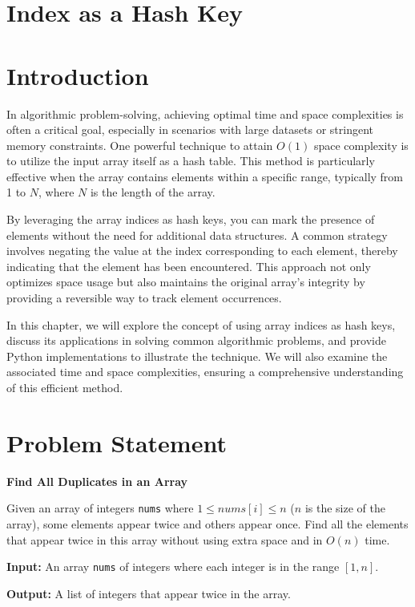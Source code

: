 \section{Index as a Hash Key}

\section*{Introduction}

In algorithmic problem-solving, achieving optimal time and space complexities is often a critical goal, especially in scenarios with large datasets or stringent memory constraints. One powerful technique to attain \(O(1)\) space complexity is to utilize the input array itself as a hash table. This method is particularly effective when the array contains elements within a specific range, typically from 1 to \(N\), where \(N\) is the length of the array.

By leveraging the array indices as hash keys, you can mark the presence of elements without the need for additional data structures. A common strategy involves negating the value at the index corresponding to each element, thereby indicating that the element has been encountered. This approach not only optimizes space usage but also maintains the original array's integrity by providing a reversible way to track element occurrences.

In this chapter, we will explore the concept of using array indices as hash keys, discuss its applications in solving common algorithmic problems, and provide Python implementations to illustrate the technique. We will also examine the associated time and space complexities, ensuring a comprehensive understanding of this efficient method.

\section*{Problem Statement}

\textbf{Find All Duplicates in an Array}

Given an array of integers \texttt{nums} where \(1 \leq nums[i] \leq n\) (\(n\) is the size of the array), some elements appear twice and others appear once. Find all the elements that appear twice in this array without using extra space and in \(O(n)\) time.

\textbf{Input:} An array \texttt{nums} of integers where each integer is in the range \([1, n]\).

\textbf{Output:} A list of integers that appear twice in the array.

